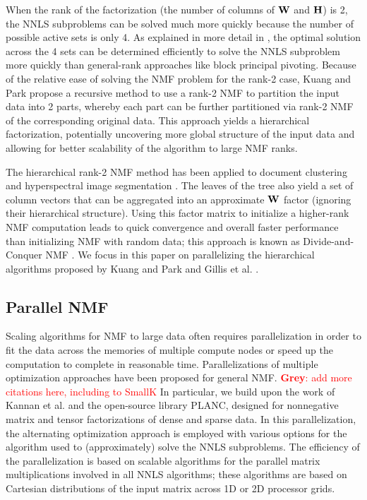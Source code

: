 \documentclass[conference,compsoc]{IEEEtran}
\newcommand{\GB}[1]{\textcolor{red}{\textbf{Grey}: #1}}
\begin{document}
When the rank of the factorization (the number of columns of $\M{W}$ and $\M{H}$) is 2, the NNLS subproblems can be solved much more quickly because the number of possible active sets is only 4.
As explained in more detail in , the optimal solution across the 4 sets can be determined efficiently to solve the NNLS subproblem more quickly than general-rank approaches like block principal pivoting.
Because of the relative ease of solving the NMF problem for the rank-2 case, Kuang and Park \cite{KP13} propose a recursive method to use a rank-2 NMF to partition the input data into 2 parts, whereby each part can be further partitioned via rank-2 NMF of the corresponding original data.
This approach yields a hierarchical factorization, potentially uncovering more global structure of the input data and allowing for better scalability of the algorithm to large NMF ranks.

The hierarchical rank-2 NMF method has been applied to document clustering \cite{KP13} and hyperspectral image segmentation \cite{GKP15}.
The leaves of the tree also yield a set of column vectors that can be aggregated into an approximate $\M{W}$ factor (ignoring their hierarchical structure).
Using this factor matrix to initialize a higher-rank NMF computation leads to quick convergence and overall faster performance than initializing NMF with random data; this approach is known as Divide-and-Conquer NMF \cite{DKDP17}.
We focus in this paper on parallelizing the hierarchical algorithms proposed by Kuang and Park \cite{KP13} and Gillis et al. \cite{GKP15}.

\subsection{Parallel NMF}

Scaling algorithms for NMF to large data often requires parallelization in order to fit the data across the memories of multiple compute nodes or speed up the computation to complete in reasonable time.
Parallelizations of multiple optimization approaches have been proposed for general NMF. \GB{add more citations here, including to SmallK}
In particular, we build upon the work of Kannan et al. \cite{KBP16,KBP17,EH+19-TR} and the open-source library PLANC, designed for nonnegative matrix and tensor factorizations of dense and sparse data.
In this parallelization, the alternating optimization approach is employed with various options for the algorithm used to (approximately) solve the NNLS subproblems.
The efficiency of the parallelization is based on scalable algorithms for the parallel matrix multiplications involved in all NNLS algorithms; these algorithms are based on Cartesian distributions of the input matrix across 1D or 2D processor grids.
\end{document}
